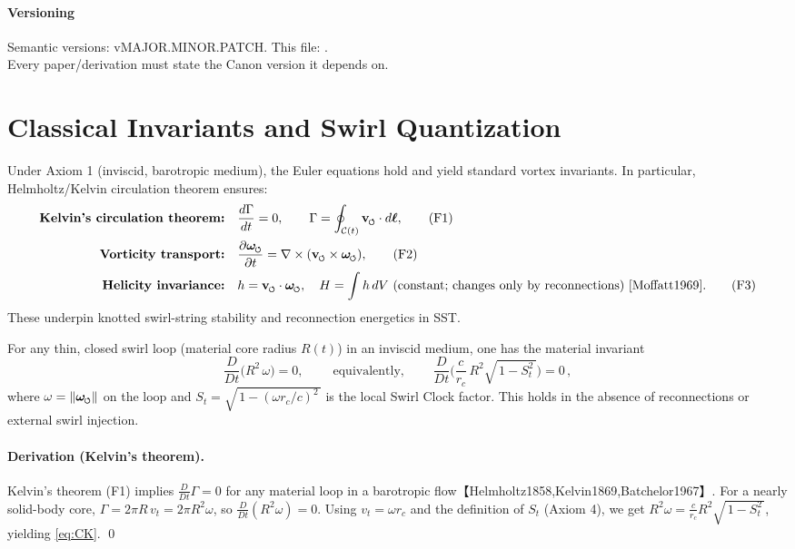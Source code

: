 \documentclass[11pt]{article}
\begin{document}
\vfill
\paragraph{Versioning} Semantic versions: vMAJOR.MINOR.PATCH. This file: \canonversion.\\
    Every paper/derivation must state the Canon version it depends on.
    \titlepageClose

\section{Classical Invariants and Swirl Quantization}
\label{sec:classical_invariants}
Under Axiom 1 (inviscid, barotropic medium), the Euler equations hold and yield standard vortex invariants. In particular, Helmholtz/Kelvin circulation theorem ensures:
\begin{align}
\textbf{Kelvin's circulation theorem:} & \quad \frac{d\Gamma}{dt}=0, \qquad \Gamma=\oint_{\mathcal{C}(t)} \vswirl\cdot d\boldsymbol{\ell}, \tag{F1} \label{eq:kelvin} \\
\textbf{Vorticity transport:} & \quad \pdv{\omegas}{t} = \nabla\times(\vswirl\times \omegas), \tag{F2} \label{eq:vorticity-transport}\\
\textbf{Helicity invariance:} & \quad h=\vswirl\cdot \omegas,\quad H=\int h\, dV\ \text{(constant; changes only by reconnections)~\cite{Moffatt1969}}. \tag{F3}\label{eq:helicity}
\end{align}
These underpin knotted swirl-string stability and reconnection energetics in SST.

\begin{axiom}
\label{ax:chronos-kelvin}
For any thin, closed swirl loop (material core radius $R(t)$) in an inviscid medium, one has the material invariant
\begin{equation}
\boxed{\;
\frac{D}{Dt}\!\Big(R^2\,\omega\Big)=0,
    \;} \qquad \text{equivalently,} \qquad
\boxed{\;
\frac{D}{Dt}\!\Big(
\frac{c}{r_c}\,R^2 \sqrt{\,1-S_t^2\,}
\Big)=0\,,
    \;}
\label{eq:CK}
\end{equation}
where $\omega=\|\omegas\|$ on the loop and $S_t=\sqrt{\,1-(\omega r_c/c)^2\,}$ is the local Swirl Clock factor. This holds in the absence of reconnections or external swirl injection.
\end{axiom}

\paragraph{Derivation (Kelvin's theorem).}
    Kelvin's theorem (F1) implies $\frac{D}{Dt}\Gamma=0$ for any material loop in a barotropic flow【Helmholtz1858,Kelvin1869,Batchelor1967】. For a nearly solid-body core, $\Gamma = 2\pi R\, v_t = 2\pi R^2 \omega$, so $\frac{D}{Dt}(R^2 \omega)=0$. Using $v_t = \omega r_c$ and the definition of $S_t$ (Axiom 4), we get $R^2\omega=\frac{c}{r_c}R^2\sqrt{\,1-S_t^2\,}$, yielding \eqref{eq:CK}. \qed
\end{document}
